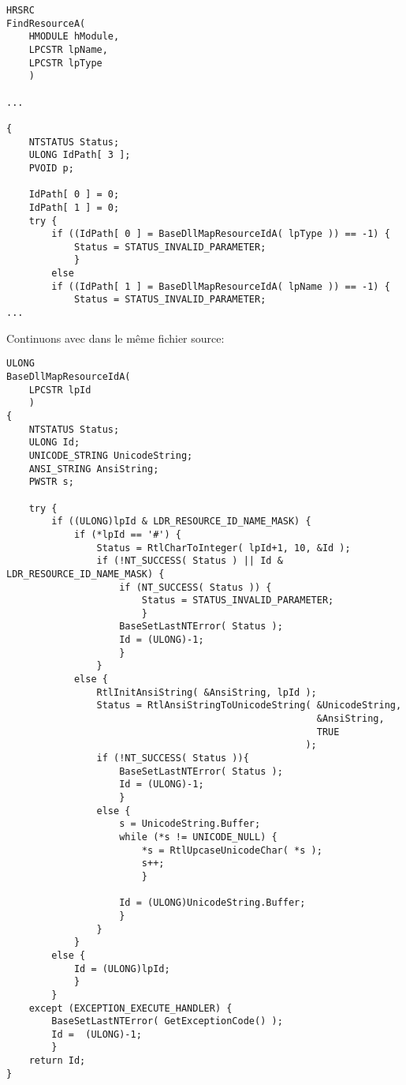 \begin{lstlisting}[style=customc]
HRSRC
FindResourceA(
    HMODULE hModule,
    LPCSTR lpName,
    LPCSTR lpType
    )

...

{
    NTSTATUS Status;
    ULONG IdPath[ 3 ];
    PVOID p;

    IdPath[ 0 ] = 0;
    IdPath[ 1 ] = 0;
    try {
        if ((IdPath[ 0 ] = BaseDllMapResourceIdA( lpType )) == -1) {
            Status = STATUS_INVALID_PARAMETER;
            }
        else
        if ((IdPath[ 1 ] = BaseDllMapResourceIdA( lpName )) == -1) {
            Status = STATUS_INVALID_PARAMETER;
...
\end{lstlisting}

Continuons avec  dans le même fichier source:

\begin{lstlisting}[style=customc]
ULONG
BaseDllMapResourceIdA(
    LPCSTR lpId
    )
{
    NTSTATUS Status;
    ULONG Id;
    UNICODE_STRING UnicodeString;
    ANSI_STRING AnsiString;
    PWSTR s;

    try {
        if ((ULONG)lpId & LDR_RESOURCE_ID_NAME_MASK) {
            if (*lpId == '#') {
                Status = RtlCharToInteger( lpId+1, 10, &Id );
                if (!NT_SUCCESS( Status ) || Id & LDR_RESOURCE_ID_NAME_MASK) {
                    if (NT_SUCCESS( Status )) {
                        Status = STATUS_INVALID_PARAMETER;
                        }
                    BaseSetLastNTError( Status );
                    Id = (ULONG)-1;
                    }
                }
            else {
                RtlInitAnsiString( &AnsiString, lpId );
                Status = RtlAnsiStringToUnicodeString( &UnicodeString,
                                                       &AnsiString,
                                                       TRUE
                                                     );
                if (!NT_SUCCESS( Status )){
                    BaseSetLastNTError( Status );
                    Id = (ULONG)-1;
                    }
                else {
                    s = UnicodeString.Buffer;
                    while (*s != UNICODE_NULL) {
                        *s = RtlUpcaseUnicodeChar( *s );
                        s++;
                        }

                    Id = (ULONG)UnicodeString.Buffer;
                    }
                }
            }
        else {
            Id = (ULONG)lpId;
            }
        }
    except (EXCEPTION_EXECUTE_HANDLER) {
        BaseSetLastNTError( GetExceptionCode() );
        Id =  (ULONG)-1;
        }
    return Id;
}
\end{lstlisting}

